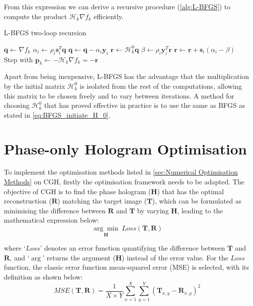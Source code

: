 From this expression we can derive a recursive procedure (\cref{alg:L-BFGS}) to compute the product $\mathcal{H}_{k} \nabla f_k$ efficiently.

\begin{algorithm}[H]
  \caption{L-BFGS two-loop recursion \cite{Nocedal2006}}\label{alg:L-BFGS}
  \begin{algorithmic}
    \State $\textbf{q} \gets \nabla f_k$
    \State $\alpha_i \gets \rho_i \textbf{s}_i^T \textbf{q}$
    \State $ \textbf{q} \gets \textbf{q} - \alpha_i\textbf{y}_i$
    \EndFor
    \State $\textbf{r}\gets \mathcal{H}_k^0 \textbf{q}$
    \State $\beta \gets \rho_i \textbf{y}_i^T \textbf{r}$
    \State $ \textbf{r} \gets \textbf{r} +\textbf{s}_i (\alpha_i-\beta)$
    \EndFor
    \State Step with $\textbf{p}_k \gets -\mathcal{H}_k \nabla f_{k} = -\textbf{r}$
  \end{algorithmic}
\end{algorithm}

Apart from being inexpensive, L-BFGS has the advantage that the multiplication by the initial matrix $\mathcal{H}_k^0$ is isolated from the rest of the computations, allowing this matrix to be chosen freely and to vary between iterations. A method for choosing $\mathcal{H}_k^0$ that has proved effective in practice is to use the same as BFGS as stated in \cref{eq:BFGS_initiate_H_0}. \cite{Nocedal2006}



\section{Phase-only Hologram Optimisation} \label{sec:Optimisation of Phase Hologram for a Target Image}

To implement the optimisation methods listed in \cref{sec:Numerical Optimisation Methods} on CGH, firstly the optimisation framework needs to be adapted. The objective of CGH is to find the phase hologram ($\textbf{H}$) that has the optimal reconstruction ($\textbf{R}$) matching the target image ($\textbf{T}$), which can be formulated as minimising the difference between $\textbf{R}$ and $\textbf{T}$ by varying $\textbf{H}$, leading to the mathematical expression below:
\begin{equation}
	\underset{\textbf{H}}{\arg \min}\ Loss(\textbf{T}, \textbf{R})
\end{equation}

where `$Loss$' denotes an error function quantifying the difference between $\textbf{T}$ and $\textbf{R}$, and `$\arg$' returns the argument ($\textbf{H}$) instead of the error value. For the $Loss$ function, the classic error function mean-squared error (MSE) \cite{MSE_REF} is selected, with its definition as shown below:
\begin{equation}
  MSE(\textbf{T}, \textbf{R}) = \frac{1}{X\times Y} \sum_{x=1}^{X} \sum_{y=1}^{Y} (\textbf{T}_{x,y}-\textbf{R}_{x,y})^2
  \label{eq:MSE}
\end{equation}

